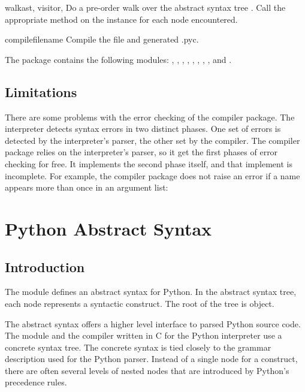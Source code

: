 \documentclass{manual}
\begin{document}
\begin{funcdesc}{walk}{ast, visitor, }
Do a pre-order walk over the abstract syntax tree .  Call the
appropriate method on the  instance for each node
encountered. 
\end{funcdesc}

\begin{funcdesc}{compile}{filename}
Compile the file  and generated .pyc.
\end{funcdesc}

The  package contains the following modules:
, , , ,
, , ,
, and .

\section{Limitations}

There are some problems with the error checking of the compiler
package.  The interpreter detects syntax errors in two distinct
phases.  One set of errors is detected by the interpreter's parser,
the other set by the compiler.  The compiler package relies on the
interpreter's parser, so it get the first phases of error checking for
free.  It implements the second phase itself, and that implement is
incomplete.  For example, the compiler package does not raise an error
if a name appears more than once in an argument list: 

\chapter{Python Abstract Syntax}

\section{Introduction}

The  module defines an abstract syntax for
Python.  In the abstract syntax tree, each node represents a syntactic
construct.  The root of the tree is  object.

The abstract syntax offers a higher level interface to parsed Python
source code.  The  module and the compiler written in C
for the Python interpreter use a concrete syntax tree.  The concrete
syntax is tied closely to the grammar description used for the Python
parser.  Instead of a single node for a construct, there are often
several levels of nested nodes that are introduced by Python's
precedence rules.
\end{document}
